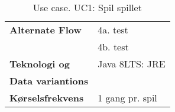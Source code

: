 \documentclass[class=article, crop=false]{standalone}
\begin{document}
\begin{table}[H]
\begin{tabularx}{\textwidth}{|l|X|}
            \textbf{Alternate Flow}   & 4a. test \\
                                      & 4b. test \\



            \hline








            \textbf{Teknologi og}     & Java 8LTS: JRE \\
            \textbf{Data variantions} &  \\ \hline
            \textbf{Kørselsfrekvens} & 1 gang pr. spil\\ \hline
        \end{tabularx}
        \caption{Use case. UC1: Spil spillet}

    \end{table}
\end{document}
